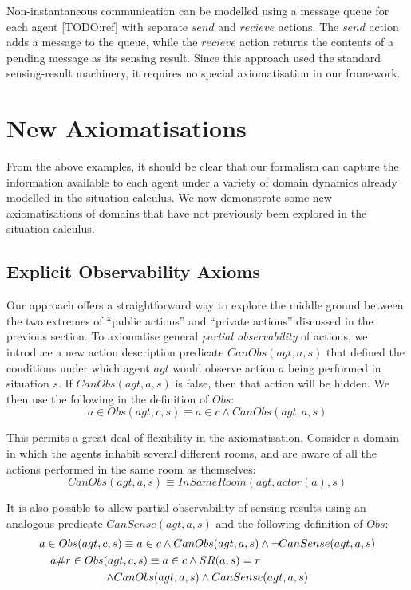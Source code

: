 Non-instantaneous communication can be modelled using a message queue
for each agent {[}TODO:ref] with separate $send$ and $recieve$ actions.
The $send$ action adds a message to the queue, while the $recieve$
action returns the contents of a pending message as its sensing result.
Since this approach used the standard sensing-result machinery, it
requires no special axiomatisation in our framework.


\section{New Axiomatisations\label{sec:Observations:Axiomatising-extended}}

From the above examples, it should be clear that our formalism can
capture the information available to each agent under a variety of
domain dynamics already modelled in the situation calculus. We now
demonstrate some new axiomatisations of domains that have not previously
been explored in the situation calculus.


\subsection{Explicit Observability Axioms}

Our approach offers a straightforward way to explore the middle ground
between the two extremes of {}``public actions'' and {}``private
actions'' discussed in the previous section. To axiomatise general
\emph{partial observability} of actions, we introduce a new action
description predicate $CanObs(agt,a,s)$ that defined the conditions
under which agent $agt$ would observe action $a$ being performed
in situation $s$. If $CanObs(agt,a,s)$ is false, then that action
will be hidden. We then use the following in the definition of $Obs$:\[
a\in Obs(agt,c,s)\equiv a\in c\wedge CanObs(agt,a,s)\]


This permits a great deal of flexibility in the axiomatisation. Consider
a domain in which the agents inhabit several different rooms, and
are aware of all the actions performed in the same room as themselves:\[
CanObs(agt,a,s)\equiv InSameRoom(agt,actor(a),s)\]


It is also possible to allow partial observability of sensing results
using an analogous predicate $CanSense(agt,a,s)$ and the following
definition of $Obs$:\begin{multline*}
a\in Obs(agt,c,s)\equiv a\in c\wedge CanObs(agt,a,s)\wedge\neg CanSense(agt,a,s)\\
\shoveleft{a\#r\in Obs(agt,c,s)\equiv a\in c\wedge SR(a,s)=r}\\
\wedge CanObs(agt,a,s)\wedge CanSense(agt,a,s)\end{multline*}


